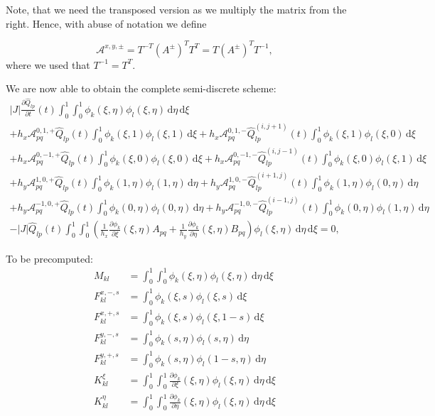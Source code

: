 \documentclass[a4paper]{scrartcl}
\newcommand{\dd}[1]{\,\mathrm{d}#1}
\begin{document}
Note, that we need the transposed version as we multiply the matrix from the right. Hence,
with abuse of notation we define

\begin{equation}
 \mathcal{A}^{x,y,\pm} = T^{-T}\left(A^\pm\right)^T T^{T} = T\left(A^\pm\right)^T T^{-1},
\end{equation}
where we used that $T^{-1}=T^T$.



We are now able to obtain the complete semi-discrete scheme:
\begin{multline}
 |J|\frac{\partial \hat{Q}_{lp}}{\partial t}(t)\int_{0}^{1}\int_{0}^{1}\phi_k(\xi,\eta)\phi_l(\xi,\eta)\dd{\eta}\dd{\xi} \\
 + h_x\mathcal{A}_{pq}^{0,1,+}\hat{Q}_{lp}(t)\int_{0}^{1}\phi_k(\xi,1)\phi_l(\xi,1) \dd{\xi}
 + h_x\mathcal{A}_{pq}^{0,1,-}\hat{Q}^{(i,j+1)}_{lp}(t)\int_{0}^{1}\phi_k(\xi,1)\phi_l(\xi,0) \dd{\xi} \\
 + h_x\mathcal{A}_{pq}^{0,-1,+}\hat{Q}_{lp}(t)\int_{0}^{1}\phi_k(\xi,0)\phi_l(\xi,0) \dd{\xi}
 + h_x\mathcal{A}_{pq}^{0,-1,-}\hat{Q}^{(i,j-1)}_{lp}(t)\int_{0}^{1}\phi_k(\xi,0)\phi_l(\xi,1) \dd{\xi} \\
 + h_y\mathcal{A}_{pq}^{1,0,+}\hat{Q}_{lp}(t)\int_{0}^{1}\phi_k(1,\eta)\phi_l(1,\eta) \dd{\eta}
 + h_y\mathcal{A}_{pq}^{1,0,-}\hat{Q}^{(i+1,j)}_{lp}(t)\int_{0}^{1}\phi_k(1,\eta)\phi_l(0,\eta) \dd{\eta} \\
 + h_y\mathcal{A}_{pq}^{-1,0,+}\hat{Q}_{lp}(t)\int_{0}^{1}\phi_k(0,\eta)\phi_l(0,\eta) \dd{\eta} 
 + h_y\mathcal{A}_{pq}^{-1,0,-}\hat{Q}^{(i-1,j)}_{lp}(t)\int_{0}^{1}\phi_k(0,\eta)\phi_l(1,\eta) \dd{\eta} \\
 - |J|\hat{Q}_{lp}(t)\int_{0}^{1}\int_{0}^{1}\left(\frac{1}{h_x}\frac{\partial \phi_k}{\partial \xi}(\xi,\eta)A_{pq} + \frac{1}{h_y}\frac{\partial \phi_k}{\partial \eta}(\xi,\eta)B_{pq}\right)\phi_l(\xi,\eta)\dd{\eta}\dd{\xi} = 0,
\end{multline}

To be precomputed:
\begin{align*}
 M_{kl} &= \int_{0}^{1}\int_{0}^{1}\phi_k(\xi,\eta)\phi_l(\xi,\eta)\dd{\eta}\dd{\xi} \\
 F_{kl}^{x,-,s} &= \int_{0}^{1}\phi_k(\xi,s)\phi_l(\xi,s) \dd{\xi} \\
 F_{kl}^{x,+,s} &= \int_{0}^{1}\phi_k(\xi,s)\phi_l(\xi,1-s) \dd{\xi} \\
 F_{kl}^{y,-,s} &= \int_{0}^{1}\phi_k(s,\eta)\phi_l(s,\eta) \dd{\eta} \\
 F_{kl}^{y,+,s} &= \int_{0}^{1}\phi_k(s,\eta)\phi_l(1-s,\eta) \dd{\eta} \\
 K_{kl}^\xi &= \int_{0}^{1}\int_{0}^{1}\frac{\partial\phi_k}{\partial\xi}(\xi,\eta)\phi_l(\xi,\eta)\dd{\eta}\dd{\xi} \\
 K_{kl}^\eta &= \int_{0}^{1}\int_{0}^{1}\frac{\partial\phi_k}{\partial\eta}(\xi,\eta)\phi_l(\xi,\eta)\dd{\eta}\dd{\xi}
\end{align*}
\end{document}
